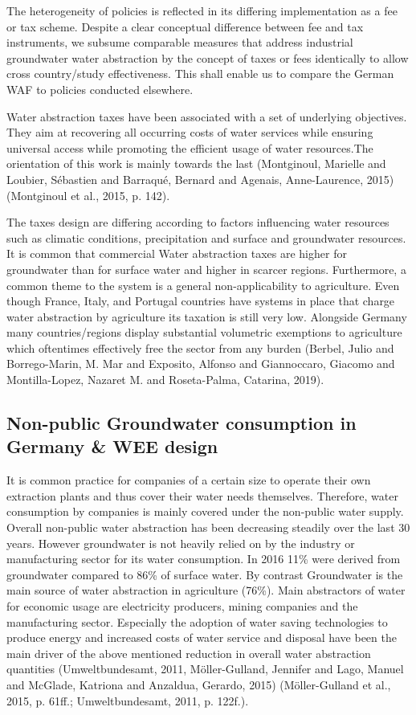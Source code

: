 \documentclass[11pt]{article}
\begin{document}
The heterogeneity of policies is reflected in its differing implementation as a fee or tax scheme. Despite a clear conceptual difference between fee and tax instruments, we subsume comparable measures that address industrial groundwater water abstraction by the concept of taxes or fees identically to allow cross country/study effectiveness. This shall enable us to compare the German WAF to policies conducted elsewhere. 

Water abstraction taxes have been associated with a set of underlying objectives. They aim at recovering all occurring costs of water services while ensuring universal access while promoting the efficient usage of water resources.The orientation of this work is mainly towards the last (Montginoul, Marielle and Loubier, Sébastien and Barraqué, Bernard and Agenais, Anne-Laurence, 2015) (Montginoul et al., 2015, p. 142).

The taxes design are differing according to factors influencing water resources such as climatic conditions, precipitation and surface and groundwater resources. It is common that commercial Water abstraction taxes are higher for groundwater than for surface water and higher in scarcer regions. Furthermore, a common theme to the system is a general non-applicability to agriculture. Even though France, Italy, and Portugal countries have systems in place that charge water abstraction by agriculture its taxation is still very low. Alongside Germany many countries/regions display substantial volumetric exemptions to agriculture which oftentimes effectively free the sector from any burden (Berbel, Julio and Borrego-Marin, M. Mar and Exposito, Alfonso and Giannoccaro, Giacomo and Montilla-Lopez, Nazaret M. and Roseta-Palma, Catarina, 2019). 

\subsection{Non-public Groundwater consumption in Germany \& WEE design}
\label{sec:org1bb9128}
\label{sec: German WAF}
It is common practice for companies of a certain size to operate their own extraction plants and thus cover their water needs themselves. Therefore, water consumption by companies is mainly covered under the non-public water supply. Overall non-public water abstraction has been decreasing steadily over the last 30 years. However groundwater is not heavily relied on by the industry or manufacturing sector for its water consumption. In 2016 11\% were derived from groundwater compared to 86\% of surface water. By contrast Groundwater is the main source of water abstraction in agriculture (76\%). 
Main abstractors of water for economic usage are electricity producers, mining companies and the manufacturing sector. Especially the adoption of water saving technologies to produce energy and increased costs of water service and disposal have been the main driver of the above mentioned reduction in overall water abstraction quantities (Umweltbundesamt, 2011,  Möller-Gulland, Jennifer and Lago, Manuel and McGlade, Katriona and Anzaldua, Gerardo, 2015) (Möller-Gulland et al., 2015, p. 61ff.; Umweltbundesamt, 2011, p. 122f.).
\end{document}
